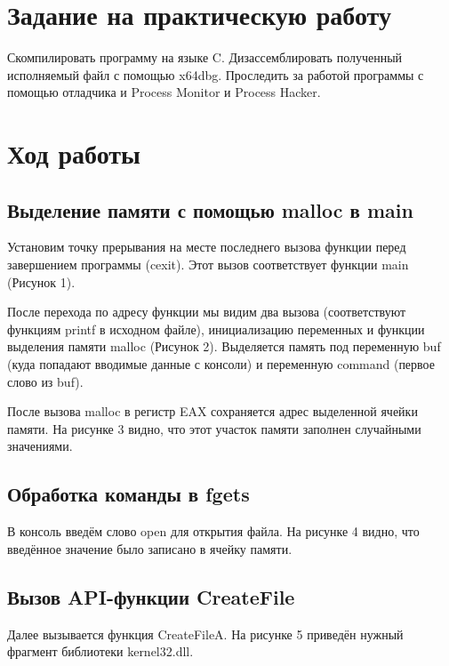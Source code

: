 \section{Задание на практическую работу}
Скомпилировать программу на языке C. Дизассемблировать полученный исполняемый файл с помощью x64dbg. Проследить за работой программы с помощью отладчика и Process Monitor и Process Hacker.



\section{Ход работы}

\subsection{Выделение памяти с помощью malloc в main}

Установим точку прерывания на месте последнего вызова функции перед завершением программы (cexit). Этот вызов соответствует функции main (Рисунок 1). 

После перехода по адресу функции мы видим два вызова (соответствуют функциям printf в исходном файле), инициализацию переменных и функции выделения памяти malloc (Рисунок 2). Выделяется память под переменную buf (куда попадают вводимые данные с консоли) и переменную command (первое слово из buf).

После вызова malloc в регистр EAX сохраняется адрес выделенной ячейки памяти. На рисунке 3 видно, что этот участок памяти заполнен случайными значениями.
\FloatBarrier


\subsection{Обработка команды в fgets}
В консоль введём слово open для открытия файла. На рисунке 4 видно, что введённое значение было записано в ячейку памяти.

\FloatBarrier


\subsection{Вызов API-функции CreateFile}
Далее вызывается функция CreateFileA. На рисунке 5 приведён нужный фрагмент библиотеки kernel32.dll.

